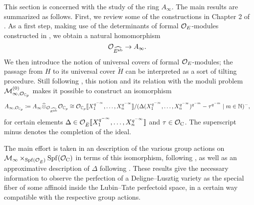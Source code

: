 \documentclass[../main.tex]{subfiles}
\begin{document}
This section is concerned with the study of the ring $A_\infty$. 
The main results are summarized as follows. 
First, we review some of the constructions in Chapter 2 of
\cite{weinstein2016semistable}. As a first step, making use of the determinants
of formal $\mathcal{O}_E$-modules constructed in \cite{hedayatzadeh2015det}, we obtain
a natural homomorphism
\begin{equation*}
   \mathcal{O}_{\widehat{E^{\mathrm{ab}}}} \to  A_\infty.
\end{equation*}
We then introduce the notion of universal covers of formal $\mathcal{O}_E$-modules; the 
passage from $H$ to its universal cover $\tilde H$ can be interpreted as a sort
of tilting procedure. Still following \cite{weinstein2016semistable}, this
notion and its relation with the moduli problem $\mathcal{M}_{\infty,
\mathcal{O}_{\mathbb{C}_p}}^{(0)}$ makes it possible to construct an isomorphism
\begin{equation}\label{eq:ExplicitAinftyBCtoOC}
  A_{\infty, \mathcal{O}_{\mathbb{C}_p}} \coloneq A_\infty \widehat \otimes_{\mathcal{O}_{\widehat{E^{\mathrm{ab}}}}}
  \mathcal{O}_{\mathbb{C}_p} 
  \cong \mathcal{O}_{\mathbb{C}_p} \llbracket X_1^{q^{-\infty}}, \dots, X_n^{q^{-\infty}} \rrbracket /
  (\Delta(X_1^{q^{-\infty}}, \dots, X_n^{q^{-\infty}})^{q^{-m}} - \tau^{q^{-m}} \mid 
  m \in \mathbb{N})^- ,
\end{equation}
for certain elements $\Delta \in \mathcal{O}_{{\breve {E}}} \llbracket X_1^{q^{-\infty}}, \dots,
X_n^{q^{-\infty}}\rrbracket$ and $\tau \in \mathcal{O}_{\mathrm{C}}$. The superscript minus denotes
the completion of the ideal.

The main effort is taken in an description of the various group actions on
$\mathcal{M}_\infty \times_{\operatorname{Spf}(\mathcal{O}_{\breve {E}})} \operatorname{Spf}(\mathcal{O}_{\mathrm{C}})$ in terms of this
isomorphism, following \cite[Section 1.2]{imaitsushima2020affinoids}, 
as well as an approximative description of $\Delta$ following \cite[Section
2.10]{BoyarchenkoWeinstein2011MaxVar}.
These results give the necessary information to observe the perfection of a
Deligne--Lusztig variety as the special fiber of some affinoid inside the
Lubin--Tate perfectoid space, in a certain way compatible with the respective group
actions. 

\end{document}
